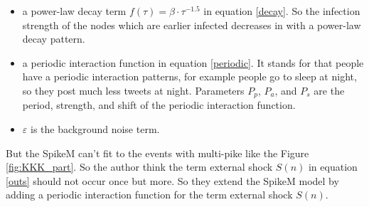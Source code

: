  \begin{itemize}
\item a power-law decay term $f(\tau)=\beta \cdot \tau ^{-1.5}
$ in equation \ref{decay}. So the infection strength of the nodes which are earlier infected decreases in with a power-law decay pattern. 


\item a periodic interaction function in equation \ref{periodic}. It stands for that people have a periodic interaction patterns, for example people go to sleep at night, so they post much less tweets at night. Parameters $P_p$, $P_a$, and $P_s$ are the period, strength, and shift of the periodic interaction function.
\item $\varepsilon$ is the background noise term. 
\end{itemize}
\begin{table}[!h]
 \centering
{}
\caption{Parameters of SpikeM}
\label{tab:Features_Impsortance}
\end{table}
But the SpikeM can't fit to the events with multi-pike like the Figure \ref{fig:KKK_part}. So the author think the term external shock $S(n)$ in equation \ref{outs} should not occur once but more. So they extend the SpikeM model by adding a periodic interaction function for the term external shock $S(n)$.

